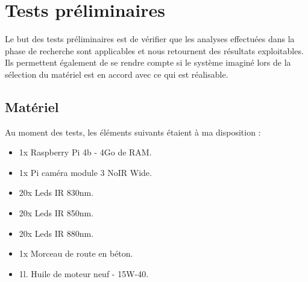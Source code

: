 \section{Tests préliminaires \label{test_vision}}
Le but des tests préliminaires est de vérifier que les analyses effectuées dans la phase de recherche sont applicables et nous retournent
des résultats exploitables. Ils permettent également de se rendre compte si le système imaginé lors de la sélection du matériel est en accord avec
ce qui est réalisable.
\subsection{Matériel}
Au moment des tests, les éléments suivants étaient à ma disposition :
\begin{itemize}
    \item 1x Raspberry Pi 4b - 4Go de RAM.
    \item 1x Pi caméra module 3 NoIR Wide.
    \item 20x Leds IR 830nm.
    \item 20x Leds IR 850nm.
    \item 20x Leds IR 880nm.
    \item 1x Morceau de route en béton.
    \item 1l. Huile de moteur neuf - 15W-40.
\end{itemize}

